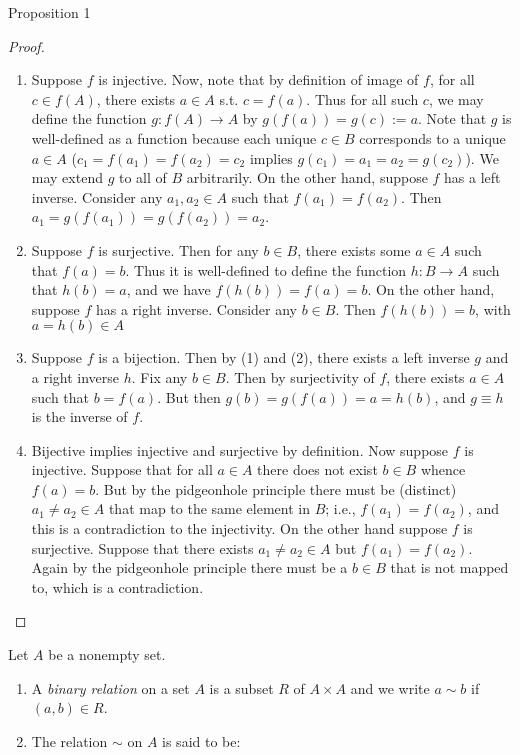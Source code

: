 \begin{namedthm*}{Proposition 1}
\begin{proof}
    \begin{enumerate}[(1)]
        \item Suppose $f$ is injective. 
        Now, note that by definition of image of $f$, for all $c\in f(A)$, there exists $a\in A$ s.t. $c=f(a)$.
        Thus for all such $c$, we may define the function $g:f(A)\to A$ by $g(f(a))=g(c):=a$.
        Note that $g$ is well-defined as a function because each unique $c\in B$ corresponds to a unique $a\in A$ ($c_1=f(a_1)= f(a_2)=c_2$ implies $g(c_1)=a_1=a_2=g(c_2)$).
        We may extend $g$ to all of $B$ arbitrarily.
        On the other hand, suppose $f$ has a left inverse.
        Consider any $a_1,a_2\in A$ such that $f(a_1)=f(a_2)$.
        Then $a_1=g(f(a_1))=g(f(a_2))=a_2$.
        \item Suppose $f$ is surjective. 
        Then for any $b\in B$, there exists some $a\in A$ such that $f(a)=b$. 
        Thus it is well-defined to define the function $h:B\to A$ such that $h(b)=a$, and we have $f(h(b))=f(a)=b$.
        On the other hand, suppose $f$ has a right inverse.
        Consider any $b\in B$.
        Then $f(h(b))=b$, with $a=h(b)\in A$
        \item Suppose $f$ is a bijection.
        Then by (1) and (2), there exists a left inverse $g$ and a right inverse $h$.
        Fix any $b\in B$.
        Then by surjectivity of $f$, there exists $a\in A$ such that $b=f(a)$.
        But then $g(b)=g(f(a))=a=h(b)$, and $g\equiv h$ is the inverse of $f$.
        \item Bijective implies injective and surjective by definition.
        Now suppose $f$ is injective.
        Suppose that for all $a\in A$ there does not exist $b\in B$ whence $f(a)=b$.
        But by the pidgeonhole principle there must be (distinct) $a_1\neq a_2\in A$ that map to the same element in $B$; i.e., $f(a_1)=f(a_2)$, and this is a contradiction to the injectivity.
        On the other hand suppose $f$ is surjective.
        Suppose that there exists $a_1\neq a_2\in A$ but $f(a_1)=f(a_2)$.
        Again by the pidgeonhole principle there must be a $b\in B$ that is not mapped to, which is a contradiction.
    \end{enumerate}
    \end{proof}
    Let $A$ be a nonempty set.
    \begin{enumerate}[(1)]
        \item A \textit{binary relation} on a set $A$ is a subset $R$ of $A\times A$ and we write $a\sim b$ if $(a,b)\in R$.
        \item The relation $\sim$ on $A$ is said to be:

\end{enumerate}
\end{namedthm*}
